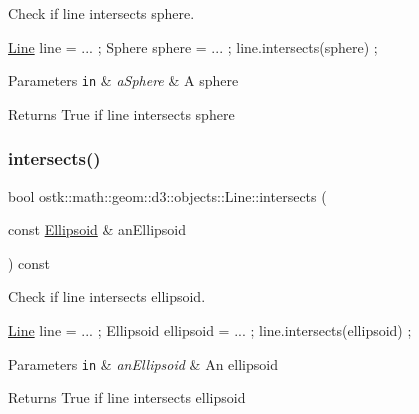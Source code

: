 Check if line intersects sphere. 


\begin{DoxyCode}
\hyperlink{classostk_1_1math_1_1geom_1_1d3_1_1objects_1_1_line_a9ebdaaf67a4bd91780808f8683463ebe}{Line} line = ... ;
Sphere sphere = ... ;
line.intersects(sphere) ;
\end{DoxyCode}



\begin{DoxyParams}[1]{Parameters}
\mbox{\tt in}  & {\em a\+Sphere} & A sphere \\
\hline
\end{DoxyParams}
\begin{DoxyReturn}{Returns}
True if line intersects sphere 
\end{DoxyReturn}
\mbox{\label{classostk_1_1math_1_1geom_1_1d3_1_1objects_1_1_line_a72843cbf3252ed608969e7c4d9a1592f}} 
\subsubsection{\texorpdfstring{intersects()}{intersects()}\hspace{0.1cm}{\footnotesize\ttfamily [4/4]}}
{\footnotesize\ttfamily bool ostk\+::math\+::geom\+::d3\+::objects\+::\+Line\+::intersects (\begin{DoxyParamCaption}\item[{const \hyperlink{classostk_1_1math_1_1geom_1_1d3_1_1objects_1_1_ellipsoid}{Ellipsoid} \&}]{an\+Ellipsoid }\end{DoxyParamCaption}) const}



Check if line intersects ellipsoid. 


\begin{DoxyCode}
\hyperlink{classostk_1_1math_1_1geom_1_1d3_1_1objects_1_1_line_a9ebdaaf67a4bd91780808f8683463ebe}{Line} line = ... ;
Ellipsoid ellipsoid = ... ;
line.intersects(ellipsoid) ;
\end{DoxyCode}



\begin{DoxyParams}[1]{Parameters}
\mbox{\tt in}  & {\em an\+Ellipsoid} & An ellipsoid \\
\hline
\end{DoxyParams}
\begin{DoxyReturn}{Returns}
True if line intersects ellipsoid 
\end{DoxyReturn}
\mbox{\label{classostk_1_1math_1_1geom_1_1d3_1_1objects_1_1_line_a092640b8e18d71c734185f326698f518}} 
